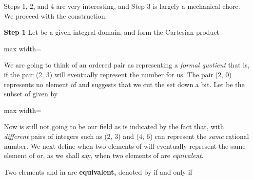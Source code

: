 \documentclass[11pt,oneside]{article}
\begin{document}
\begin{BookBody}



\noindent Steps 1, 2, and 4 are very interesting, and Step 3 is largely a mechanical chore. We proceed with the construction.

\textbf{Step 1} Let  be a given integral domain, and form the Cartesian product

\begin{center}\begin{adjustbox}{max width=\linewidth}\end{adjustbox}\end{center}

\noindent We are going to think of an ordered pair  as representing a\textit{ formal quotient}  that is, if  the pair (2, 3) will eventually represent the number  for us. The pair (2, 0) represents no element of  and suggests that we cut the set  down a bit. Let  be the subset of  given by

\begin{center}\begin{adjustbox}{max width=\linewidth}\end{adjustbox}\end{center}

\noindent Now  is still not going to be our field as is indicated by the fact that, with  \textit{different} pairs of integers such as (2, 3) and (4, 6) can represent the\textit{ same} rational number. We next define when two elements of  will eventually represent the same element of  or, as we shall say, when two elements of  are\textit{ equivalent}.

 Two elements  and  in  are\textbf{ equivalent,} denoted by  if and only if \BookEnd{\blacksquare}


\end{BookBody}
\end{document}
